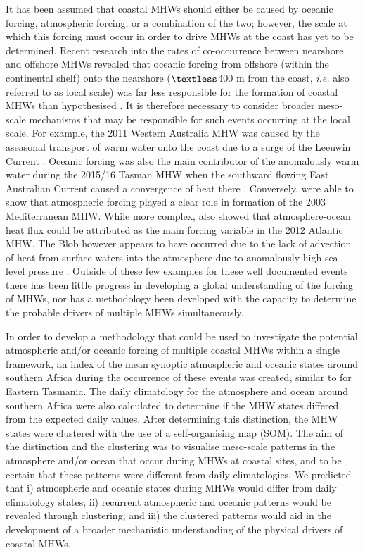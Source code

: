 \documentclass[utf8]{frontiersSCNS}
\begin{document}
It has been assumed that coastal MHWs should either be caused by oceanic forcing, atmospheric forcing, or a combination of the two; however, the scale at which this forcing must occur in order to drive MHWs at the coast has yet to be determined. Recent research into the rates of co-occurrence between nearshore and offshore MHWs revealed that oceanic forcing from offshore (within the continental shelf) onto the nearshore ($\textless$400 m from the coast, \emph{i.e.} also referred to as local scale) was far less responsible for the formation of coastal MHWs than hypothesised \citep{Schlegel2017}. It is therefore necessary to consider broader meso-scale mechanisms that may be responsible for such events occurring at the local scale. For example, the 2011 Western Australia MHW \citep{Pearce2013} was caused by the aseasonal transport of warm water onto the coast due to a surge of the Leeuwin Current \citep{Feng2013, Benthuysen2014}. Oceanic forcing was also the main contributor of the anomalously warm water during the 2015/16 Tasman MHW when the southward flowing East Australian Current caused a convergence of heat there \citep{Oliver2017}. Conversely, \citet{Garrabou2009} were able to show that atmospheric forcing played a clear role in formation of the 2003 Mediterranean MHW. While more complex, \citet{Chen2015a} also showed that atmosphere-ocean heat flux could be attributed as the main forcing variable in the 2012 Atlantic MHW. The Blob however appears to have occurred due to the lack of advection of heat from surface waters into the atmosphere due to anomalously high sea level pressure \citep{Bond2015a}. Outside of these few examples for these well documented events there has been little progress in developing a global understanding of the forcing of MHWs, nor has a methodology been developed with the capacity to determine the probable drivers of multiple MHWs simultaneously.

In order to develop a methodology that could be used to investigate the potential atmospheric and/or oceanic forcing of multiple coastal MHWs within a single framework, an index of the mean synoptic atmospheric and oceanic states around southern Africa during the occurrence of these events was created, similar to \citet{Oliver2017atlas} for Eastern Tasmania. The daily climatology for the atmosphere and ocean around southern Africa were also calculated to determine if the MHW states differed from the expected daily values. After determining this distinction, the MHW states were clustered with the use of a self-organising map (SOM). The aim of the distinction and the clustering was to visualise meso-scale patterns in the atmosphere and/or ocean that occur during MHWs at coastal sites, and to be certain that these patterns were different from daily climatologies. We predicted that i) atmospheric and oceanic states during MHWs would differ from daily climatology states; ii) recurrent atmospheric and oceanic patterns would be revealed through clustering; and iii) the clustered patterns would aid in the development of a broader mechanistic understanding of the physical drivers of coastal MHWs.
\end{document}
